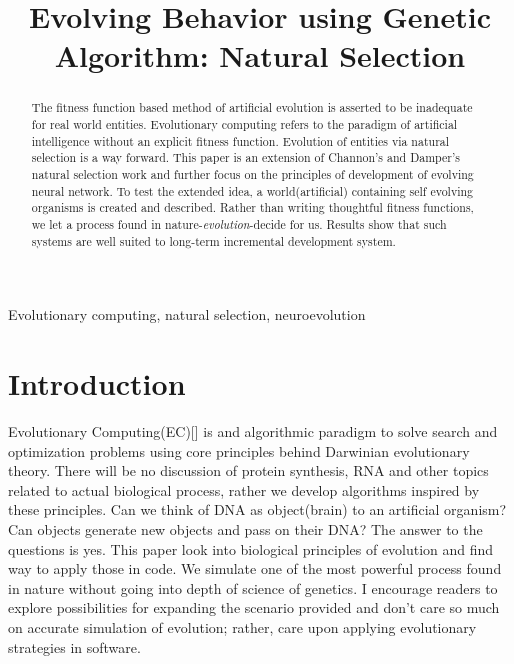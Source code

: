 \documentclass[conference]{IEEEtran}
\begin{document}
\title{Evolving Behavior using Genetic Algorithm: Natural Selection\\
}

\author{
\and
{}
}

\maketitle

\begin{abstract}
The fitness function based method of artificial evolution is asserted to be inadequate for real world entities. Evolutionary computing refers to the paradigm of artificial intelligence without an explicit fitness function. Evolution of entities via natural selection is a way forward.
This paper is an extension of Channon's and Damper's natural selection work and further focus on the principles of development of evolving neural network. To test the extended idea, a world(artificial) containing self evolving organisms is created and described. Rather than writing thoughtful fitness functions, we let a process found in nature-{\textit{evolution}}-decide for us. Results show that such systems are well suited to long-term incremental development system.
\end{abstract}

\begin{IEEEkeywords}
Evolutionary computing, natural selection, neuroevolution
\end{IEEEkeywords}

\section{Introduction}
Evolutionary Computing(EC)[] is and algorithmic paradigm to solve search and optimization problems using core principles behind Darwinian evolutionary theory. There will be no discussion of protein synthesis, RNA and other topics related to actual biological process, rather we develop algorithms inspired by these principles. Can we think of DNA as  object(brain) to an artificial organism? Can objects generate new objects and pass on their DNA? The answer to the questions is yes. This paper look into biological principles of evolution and find way to apply those in code. We simulate one of the most powerful process found in nature without going into depth of science of genetics. I encourage readers to explore possibilities for expanding the scenario provided and don't care so much on accurate simulation of evolution; rather, care upon applying evolutionary strategies in software.
\end{document}
